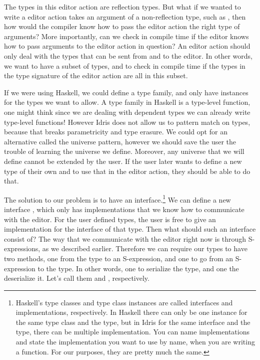The types in this editor action are reflection types. But what if we wanted to write
a editor action takes an argument of a non-reflection type, such as , then
how would the compiler know how to pass the editor action the right type of arguments?
More importantly, can we check in compile time if the editor knows how to pass
arguments to the editor action in question? An editor action should only deal
with the types that can be sent from and to the editor.
In other words, we want to have a subset of types, and to check in compile time
if the types in the type signature of the editor action are all in this subset.

If we were using Haskell, we could define a type family, and only have instances
for the types we want to allow. A type family in Haskell is a type-level
function, one might think since we are dealing with dependent types we can
already write type-level functions! However Idris does not allow us to pattern
match on types, because that breaks parametricity and type erasure.\cite{universePat}
We could opt for an alternative called the universe pattern, however we should
save the user the trouble of learning the universe we define. Moreover, any
universe that we will define cannot be extended by the user. If the user later
wants to define a new type of their own and to use that in the editor action,
they should be able to do that.

The solution to our problem is to have an interface.\footnote{Haskell's type
classes and type class instances are called interfaces and implementations,
respectively. In Haskell there can only be one instance for the same type class
and the type, but in Idris for the same interface and the type, there can be
multiple implementation. You can name implementations and state the
implementation you want to use by name, when you are writing a function. For
our purposes, they are pretty much the same.}
We can define a new interface , which only has implementations
that we know how to communicate with the editor. For the user defined types,
the user is free to give an implementation for the  interface of
that type. Then what should such an interface consist of?
The way that we communicate with the editor right now is through S-expressions,
as we described earlier. Therefore we can require our types to have two
methods, one from the type to an S-expression, and one to go from an
S-expression to the type. In other words, one to serialize the type, and one
the deserialize it. Let's call them  and , respectively.

